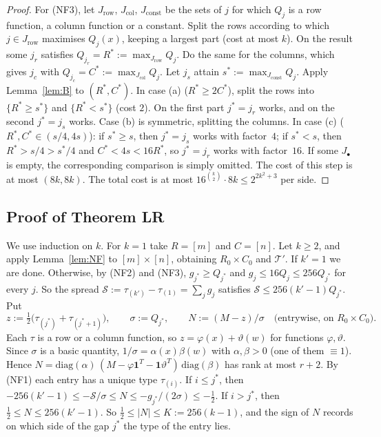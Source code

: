 \begin{proof}
For (NF3), let $J_{\mathrm{row}}$, $J_{\mathrm{col}}$, $J_{\mathrm{const}}$ be the sets of $j$ for which $Q_j$ is a row function,
a column function or a constant. Split the rows according to which $j\in J_{\mathrm{row}}$ maximises $Q_j(x)$, keeping
a largest part (cost at most $k$). On the result some $j_r$ satisfies $Q_{j_r}=R^\ast:=\max_{J_{\mathrm{row}}}Q_j$.
Do the same for the columns, which gives $j_c$ with $Q_{j_c}=C^\ast:=\max_{J_{\mathrm{col}}}Q_j$. Let $j_s$ attain
$s^\ast:=\max_{J_{\mathrm{const}}}Q_j$. Apply Lemma~\ref{lem:B} to $(R^\ast,C^\ast)$.
In case (a) ($R^\ast\ge2C^\ast$), split the rows into $\{R^\ast\ge s^\ast\}$ and $\{R^\ast<s^\ast\}$ (cost $2$).
On the first part $j^\ast=j_r$ works, and on the second $j^\ast=j_s$ works. Case (b) is symmetric, splitting the
columns. In case (c) ($R^\ast,C^\ast\in(s/4,4s)$): if $s^\ast\ge s$, then $j^\ast=j_s$ works with factor~$4$;
if $s^\ast<s$, then $R^\ast>s/4>s^\ast/4$ and $C^\ast<4s<16R^\ast$, so $j^\ast=j_r$ works with factor~$16$.
If some $J_\bullet$ is empty, the corresponding comparison is simply omitted. The cost of this step is at most
$(8k,8k)$. The total cost is at most $16^{\binom k2}\cdot 8k\le2^{2k^2+3}$ per side.
\end{proof}

\subsection{Proof of Theorem LR}
We use induction on $k$. For $k=1$ take $R=[m]$ and $C=[n]$. Let $k\ge2$, and apply Lemma~\ref{lem:NF} to
$[m]\times[n]$, obtaining $R_0\times C_0$ and $\mathcal T'$. If $k'=1$ we are done. Otherwise, by (NF2) and
(NF3), $g_{j^\ast}\ge Q_{j^\ast}$ and $g_j\le16Q_j\le256Q_{j^\ast}$ for every $j$. So the spread
$\mathcal S:=\tau_{(k')}-\tau_{(1)}=\sum_jg_j$ satisfies $\mathcal S\le256(k'-1)Q_{j^\ast}$. Put
\[
z:=\tfrac12\bigl(\tau_{(j^\ast)}+\tau_{(j^\ast+1)}\bigr),\qquad \sigma:=Q_{j^\ast},\qquad N:=(M-z)/\sigma
\quad\text{(entrywise, on $R_0\times C_0$)}.
\]
Each $\tau$ is a row or a column function, so $z=\varphi(x)+\vartheta(w)$ for functions $\varphi,\vartheta$.
Since $\sigma$ is a basic quantity, $1/\sigma=\alpha(x)\beta(w)$ with $\alpha,\beta>0$ (one of them $\equiv1$).
Hence $N=\mathrm{diag}(\alpha)\,(M-\varphi\mathbf 1^T-\mathbf 1\vartheta^T)\,\mathrm{diag}(\beta)$ has rank at
most $r+2$. By (NF1) each entry has a unique type $\tau_{(i)}$. If $i\le j^\ast$, then
$-256(k'-1)\le-\mathcal S/\sigma\le N\le-g_{j^\ast}/(2\sigma)\le-\frac12$. If $i>j^\ast$, then
$\frac12\le N\le256(k'-1)$. So $\frac12\le|N|\le K:=256(k-1)$, and the sign of $N$ records on which side of the
gap $j^\ast$ the type of the entry lies.

